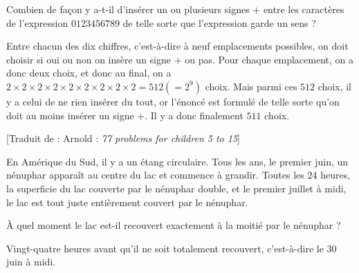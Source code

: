 \begin{exo}
Combien de façon y a-t-il d'insérer un ou plusieurs signes $+$ entre les caractères de l'expression $0123456789$ de telle sorte que l'expression garde un sens ?
\begin{sol}
Entre chacun des dix chiffres, c'est-à-dire à neuf emplacements possibles, on doit choisir si oui ou non on insère un signe $+$ ou pas. Pour chaque emplacement, on a donc deux choix, et donc au final, on a $2\times 2\times 2\times2\times2\times2\times2\times2\times 2 =512 (=2^9)$ choix. Mais parmi ces $512$ choix, il y a celui de ne rien insérer du tout, or l'énoncé est formulé de telle sorte qu'on doit au moins insérer un signe $+$. Il y a donc finalement $511$ choix.
\end{sol}
\end{exo}

\begin{exo}[Nénuphar]

[Traduit de : Arnold : \emph{77 problems for children 5 to 15}]

En Amérique du Sud, il y a un étang circulaire. Tous les ans, le premier juin, un nénuphar apparaît au centre du lac et commence à grandir. Toutes les $24$ heures, la superficie du lac couverte par le nénuphar double, et le premier juillet à midi, le lac est tout juste entièrement couvert par le nénuphar.

À quel moment le lac est-il recouvert exactement à la moitié par le nénuphar ?


\begin{sol}
Vingt-quatre heures avant qu'il ne soit totalement recouvert, c'est-à-dire le 30 juin à midi.
\end{sol}

\end{exo}

